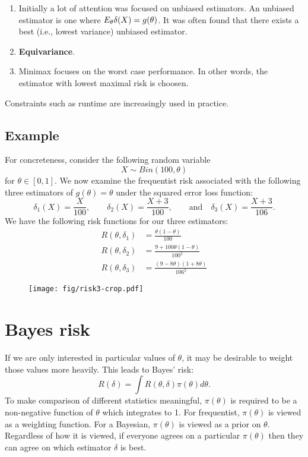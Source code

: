 \documentclass[twoside]{article}
\begin{document}
\begin{enumerate}
\item Initially a lot of attention was focused on unbiased estimators. An
  unbiased estimator is one where $E_{\theta}\delta(X) = g(\theta)$. It
  was often found that there exists a best (i.e., lowest variance) unbiased
  estimator.
\item \textbf{Equivariance}.
\item Minimax focuses on the worst case performance.  In other words, the estimator
   with lowest maximal risk is choosen.
\end{enumerate}

Constraints such as runtime are increasingly used in practice.

\subsection{Example}

For concreteness, consider \citep[Example 3.1, p.~40-41]{keener} the following
random variable
\begin{equation*}
X \sim Bin(100, \theta)
\end{equation*}
for $\theta \in [0,1]$.  We now examine the frequentist risk associated with
the following three estimators of $g(\theta) = \theta$ under the squared error
loss function:
\begin{equation*}
\delta_1(X) = \frac{X}{100}, \qquad \delta_2(X) = \frac{X+3}{100},
              \qquad \text{and} \quad \delta_3(X) = \frac{X+3}{106}.
\end{equation*}
We have the following risk functions for our three estimators:
\begin{align*}
R(\theta, \delta_1) &= \frac{\theta(1-\theta)}{100}\\
R(\theta, \delta_2) &= \frac{9+100 \theta(1-\theta)}{100^2}\\
R(\theta, \delta_3) &= \frac{(9-8\theta)(1+8\theta)}{106^2}
\end{align*}

\begin{figure}[ht]
\centering
\texttt{[image: fig/risk3-crop.pdf]}
\caption{}
\label{fig:figure3}
\end{figure}

\section{Bayes risk}

If we are only interested in particular values of $\theta$, it may be desirable
to weight those values more heavily.  This leads to Bayes' risk:
\begin{equation}
R(\delta) = \int R(\theta, \delta) \pi(\theta) d\theta.
\end{equation}
To make comparison of different statistics meaningful, $\pi(\theta)$ is
required to be a non-negative function of $\theta$ which integrates to 1.  For
frequentist, $\pi(\theta)$ is viewed as a weighting function.  For a Bayesian,
$\pi(\theta)$ is viewed as a prior on $\theta$. Regardless of how it is viewed,
if everyone agrees on a particular $\pi(\theta)$ then they can agree on
which estimator $\delta$ is best.




\end{document}
